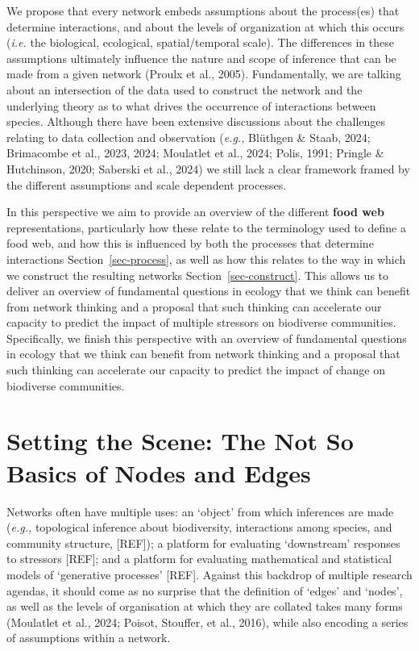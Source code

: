 \documentclass[
]{article}
\begin{document}
We propose that every network embeds assumptions about the process(es)
that determine interactions, and about the levels of organization at
which this occurs (\emph{i.e.} the biological, ecological,
spatial/temporal scale). The differences in these assumptions ultimately
influence the nature and scope of inference that can be made from a
given network (Proulx et al., 2005). Fundamentally, we are talking about
an intersection of the data used to construct the network and the
underlying theory as to what drives the occurrence of interactions
between species. Although there have been extensive discussions about
the challenges relating to data collection and observation (\emph{e.g.,}
Blüthgen \& Staab, 2024; Brimacombe et al., 2023, 2024; Moulatlet et
al., 2024; Polis, 1991; Pringle \& Hutchinson, 2020; Saberski et al.,
2024) we still lack a clear framework framed by the different
assumptions and scale dependent processes.

In this perspective we aim to provide an overview of the different
\textbf{food web} representations, particularly how these relate to the
terminology used to define a food web, and how this is influenced by
both the processes that determine interactions
Section~\ref{sec-process}, as well as how this relates to the way in
which we construct the resulting networks Section~\ref{sec-construct}.
This allows us to deliver an overview of fundamental questions in
ecology that we think can benefit from network thinking and a proposal
that such thinking can accelerate our capacity to predict the impact of
multiple stressors on biodiverse communities. Specifically, we finish
this perspective with an overview of fundamental questions in ecology
that we think can benefit from network thinking and a proposal that such
thinking can accelerate our capacity to predict the impact of change on
biodiverse communities.

\section{Setting the Scene: The Not So Basics of Nodes and
Edges}\label{sec-anatomy}

Networks often have multiple uses: an `object' from which inferences are
made (\emph{e.g.,} topological inference about biodiversity,
interactions among species, and community structure, {[}REF{]}); a
platform for evaluating `downstream' responses to stressors {[}REF{]};
and a platform for evaluating mathematical and statistical models of
`generative processes' {[}REF{]}. Against this backdrop of multiple
research agendas, it should come as no surprise that the definition of
`edges' and `nodes', as well as the levels of organisation at which they
are collated takes many forms (Moulatlet et al., 2024; Poisot, Stouffer,
et al., 2016), while also encoding a series of assumptions within a
network.
\end{document}

